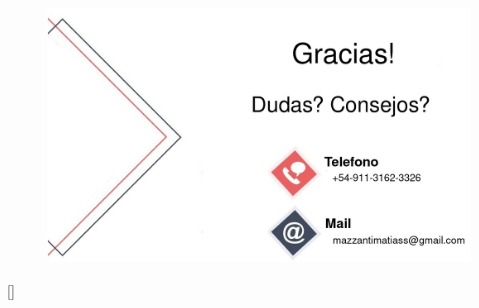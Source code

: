 \documentclass[10pt]{beamer}
\begin{document}
\begin{frame}
\frametitle{}
  \begin{figure}[h!]
      \centering
      \includegraphics[scale=0.3]{agradecimientos.jpg}
    \end{figure}[]
\end{frame}
\end{document}
